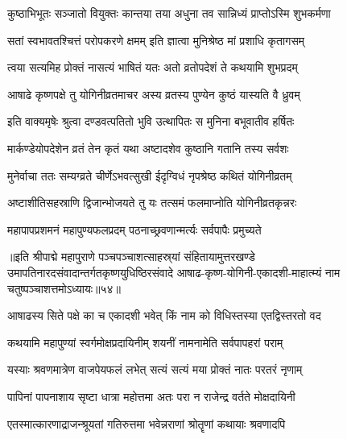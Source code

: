 \twolineshloka
{कुष्ठाभिभूतः सञ्जातो वियुक्तः कान्तया तया}
{अधुना तव सान्निध्यं प्राप्तोऽस्मि शुभकर्मणा}%

\twolineshloka
{सतां स्वभावतश्चित्तं परोपकरणे क्षमम्}
{इति ज्ञात्वा मुनिश्रेष्ठ मां प्रशाधि कृतागसम्}%


\twolineshloka
{त्वया सत्यमिह प्रोक्तं नासत्यं भाषितं यतः}
{अतो व्रतोपदेशं ते कथयामि शुभप्रदम्}%

\twolineshloka
{आषाढे कृष्णपक्षे तु योगिनीव्रतमाचर}
{अस्य व्रतस्य पुण्येन कुष्ठं यास्यति वै ध्रुवम्}%

\twolineshloka
{इति वाक्यमृषेः श्रुत्वा दण्डवत्पतितो भुवि}
{उत्थापितः स मुनिना बभूवातीव हर्षितः}%

\twolineshloka
{मार्कण्डेयोपदेशेन व्रतं तेन कृतं यथा}
{अष्टादशेव कुष्ठानि गतानि तस्य सर्वशः}%

\twolineshloka
{मुनेर्वाचा ततः सम्यग्व्रते चीर्णेऽभवत्सुखी}
{ईदृग्विधं नृपश्रेष्ठ कथितं योगिनीव्रतम्}%

\twolineshloka
{अष्टाशीतिसहस्राणि द्विजान्भोजयते तु यः}
{तत्समं फलमाप्नोति योगिनीव्रतकृन्नरः}%

\twolineshloka
{महापापप्रशमनं महापुण्यफलप्रदम्}
{पठनाच्छ्रवणान्मर्त्यः सर्वपापैः प्रमुच्यते}%

॥इति श्रीपाद्मे महापुराणे पञ्चपञ्चाशत्साहस्र्यां संहितायामुत्तरखण्डे उमापतिनारदसंवादान्तर्गतकृष्णयुधिष्ठिरसंवादे आषाढ-कृष्ण-योगिनी-एकादशी-माहात्म्यं नाम चतुष्पञ्चाशत्तमोऽध्यायः॥५४॥


\hyperref[sec:ekadashi_mahatmyam_padma_puranam]{\closesub}
\clearpage

\label{sec:padma-ashadha-shukla-shayani}



\twolineshloka
{आषाढस्य सिते पक्षे का च एकादशी भवेत्}
{किं नाम को विधिस्तस्या एतद्विस्तरतो वद}%


\twolineshloka
{कथयामि महापुण्यां स्वर्गमोक्षप्रदायिनीम्}
{शयनीं नामनामेति सर्वपापहरां पराम्}%

\twolineshloka
{यस्याः श्रवणमात्रेण वाजपेयफलं लभेत्}
{सत्यं सत्यं मया प्रोक्तं नातः परतरं नृणाम्}%

\twolineshloka
{पापिनां पापनाशाय सृष्टा धात्रा महोत्तमा}
{अतः परा न राजेन्द्र वर्तते मोक्षदायिनी}%

\twolineshloka
{एतस्मात्कारणाद्राजन्श्रूयतां गतिरुत्तमा}
{भवेन्नराणां श्रोतॄणां कथायाः श्रवणादपि}%

